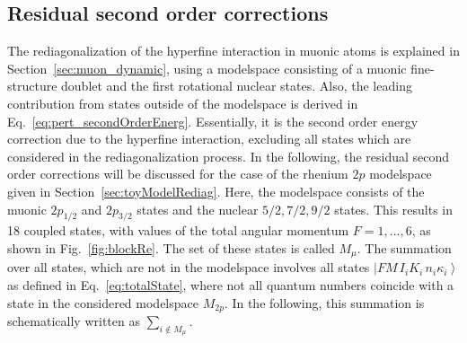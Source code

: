 \subsection{Residual second order corrections}
\label{sec:muon_residualSO}
The rediagonalization of the hyperfine interaction in muonic atoms is explained in Section~\ref{sec:muon_dynamic}, using a modelspace consisting of a muonic fine-structure doublet and the first rotational nuclear states. Also, the leading contribution from states outside of the modelspace is derived in Eq.~\eqref{eq:pert_secondOrderEnerg}. Essentially, it is the second order energy correction due to the hyperfine interaction, excluding all states which are considered in the rediagonalization process. In the following, the residual second order corrections will be discussed for the case of the rhenium $2p$ modelspace given in Section~\ref{sec:toyModelRediag}. Here, the modelspace consists of the muonic $2p_{1/2}$ and $2p_{3/2}$ states and the nuclear $5/2,7/2,9/2$ states. This results in 18 coupled states, with values of the total angular momentum $F=1,...,6$, as shown in Fig.~\ref{fig:blockRe}. The set of these states is called $M_{\mu}$. The summation over all states, which are not in the modelspace involves all states $\left|FM\,I_iK_i\,n_i\kappa_i\right>$ as defined in Eq.~\eqref{eq:totalState}, where not all quantum numbers coincide with a state in the considered modelspace $M_{2p}$. In the following, this summation is schematically written as $\sum_{i\notin M_{\mu}}$.

